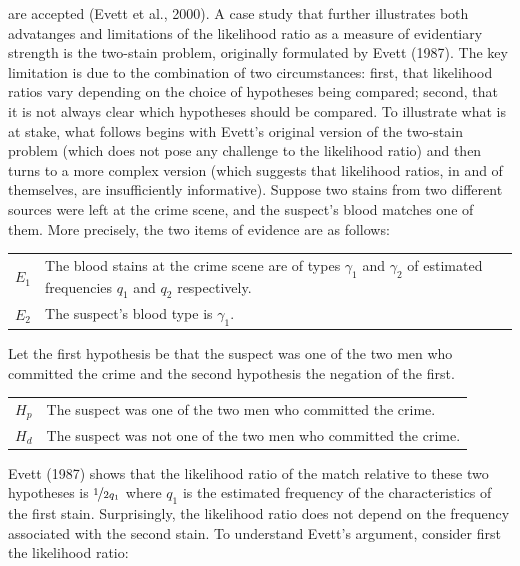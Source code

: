 \documentclass[10pt,dvipsnames,enabledeprecatedfontcommands]{scrartcl}
\begin{document}
are accepted (Evett et al., 2000). A case study that further illustrates
both advatanges and limitations of the likelihood ratio as a measure of
evidentiary strength is the two-stain problem, originally formulated by
Evett (1987). The key limitation is due to the combination of two
circumstances: first, that likelihood ratios vary depending on the
choice of hypotheses being compared; second, that it is not always clear
which hypotheses should be compared. To illustrate what is at stake,
what follows begins with Evett's original version of the two-stain
problem (which does not pose any challenge to the likelihood ratio) and
then turns to a more complex version (which suggests that likelihood
ratios, in and of themselves, are insufficiently informative). Suppose
two stains from two different sources were left at the crime scene, and
the suspect's blood matches one of them. More precisely, the two items
of evidence are as follows: \vspace{2mm}

\begin{center}
    \begin{tabular}{lp{12cm}} 
        $E_1$ & The blood stains at the crime scene are of types $\gamma_1$ and $\gamma_2$ of estimated  frequencies $q_1$ and $q_2$ respectively.\\
        $E_2$ & The suspect's blood type is $\gamma_1$. 
    \end{tabular}
 \end{center}

\vspace{2mm} Let the first hypothesis be that the suspect was one of the
two men who committed the crime and the second hypothesis the negation
of the first. \vspace{2mm}

\begin{center}
    \begin{tabular}{lp{12cm}} 
        $H_p$ & The suspect was one of the two men who committed the crime.\\
        $H_d$ & The suspect was not one of the two men who committed the crime.
    \end{tabular}
 \end{center}

\vspace{2mm} Evett (1987) shows that the likelihood ratio of the match
relative to these two hypotheses is \(\nicefrac{1}{2q_1}\) where \(q_1\)
is the estimated frequency of the characteristics of the first stain.
Surprisingly, the likelihood ratio does not depend on the frequency
associated with the second stain. To understand Evett's argument,
consider first the likelihood ratio:
\end{document}
